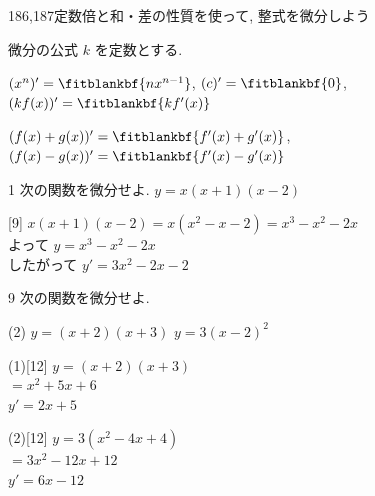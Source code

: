 \documentclass[14pt,dvipdfmx]{jsarticle}
\begin{document}
  {186,187}{定数倍と和・差の性質を使って, 整式を微分しよう}

\vspace{-2.0zw}%
\vspace{-0.5em}
\begin{reviewbox}{微分の公式}
  $k$ を定数とする.
  \par\vspace{0.15em}
  {\renewcommand{\fitblankpad}{0.5zw}%
  $(x^{n})'=\fitblankbf{nx^{n-1}}$,\qquad
  $(c)'=\fitblankbf{0}$,\qquad
  $(kf(x))'=\fitblankbf{kf'(x)}$}
  \par\vspace{0.25em}
  {\renewcommand{\fitblankpad}{0.5zw}%
  $(f(x)+g(x))'=\fitblankbf{f'(x)+g'(x)}$,\qquad
  $(f(x)-g(x))'=\fitblankbf{f'(x)-g'(x)}$}
\end{reviewbox}

\vspace{0.1em}
\begin{exampleprob}{1}
  次の関数を微分せよ.
  \hspace*{2zw}$y=x(x+1)(x-2)$
\end{exampleprob}
\vspace{0.5em}
\begin{answerbox}{}[9]
  $x(x+1)(x-2)=x(x^{2}-x-2)=x^{3}-x^{2}-2x$\\[0.3em]
  よって $y=x^{3}-x^{2}-2x$\\[0.25em]
  したがって $y'=3x^{2}-2x-2$
\end{answerbox}

\vspace{0.05em}
\begin{practiceprob}{9}
  次の関数を微分せよ.
  \begin{tasks}[label=(\arabic*), label-width=1.6zw, item-indent=2zw, after-item-skip=0.08em](2)
    \task $y=(x+2)(x+3)$
    \task $y=3(x-2)^{2}$
  \end{tasks}
\end{practiceprob}
\vspace{-0.45em}
\noindent
\begin{minipage}[t]{0.49\linewidth}
\begin{answerbox}{(1)}[12]
  $y=(x+2)(x+3)$\\[0.15em]
  $=x^{2}+5x+6$\\[0.15em]
  $y'=2x+5$
\end{answerbox}
\end{minipage}\hfill
\begin{minipage}[t]{0.49\linewidth}
\begin{answerbox}{(2)}[12]
  $y=3(x^{2}-4x+4)$\\[0.15em]
  $=3x^{2}-12x+12$\\[0.15em]
  $y'=6x-12$
\end{answerbox}
\end{minipage}
\end{document}
